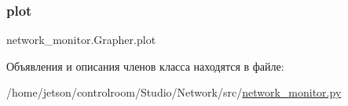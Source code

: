 \mbox{\label{classnetwork__monitor_1_1_grapher_a3ebf5396c625164b8ef6477aeabfcd2d}} 
\subsubsection{\texorpdfstring{plot}{plot}}
{\footnotesize\ttfamily network\+\_\+monitor.\+Grapher.\+plot}



Объявления и описания членов класса находятся в файле\+:\begin{DoxyCompactItemize}
\item 
/home/jetson/controlroom/\+Studio/\+Network/src/\hyperlink{network__monitor_8py}{network\+\_\+monitor.\+py}\end{DoxyCompactItemize}
